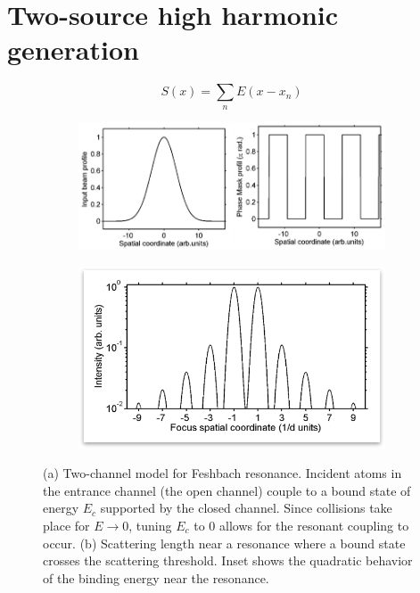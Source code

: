 \section{Two-source high harmonic generation}


\begin{equation}
\label{eq:field}
S(x) = \sum_{n} E(x - x_{n})
\end{equation}






\begin{figure}
	\centering
	\begin{subfigure}[b]{0.45\textwidth}
		\caption{}
		\includegraphics[width=\textwidth]{figures/Two_source/spatial_profile}
		\label{fig:spatial_profile}
	\end{subfigure}
	\begin{subfigure}[b]{0.45\textwidth}
		\caption{}
		\includegraphics[width=\textwidth]{figures/Two_source/focus_profile}
		\label{fig:focus_profile}
	\end{subfigure}
	\caption{(a) Two-channel model for Feshbach resonance.  Incident atoms in the entrance channel (the open channel) couple to a bound state of energy $E_{c}$ supported by the closed channel.  Since collisions take place for $E\rightarrow 0$, tuning $E_{c}$ to 0 allows for the resonant coupling to occur. (b) Scattering length near a resonance where a bound state crosses the scattering threshold. Inset shows the quadratic behavior of the binding energy near the resonance.}
\end{figure}


